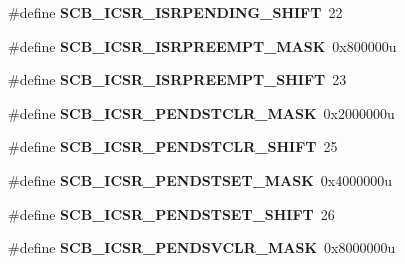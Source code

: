 \begin{DoxyCompactItemize}
\item 
\hypertarget{group___s_c_b___register___masks_ga22f457e32a8d6a617ff90bdfb7b874de}{}\#define {\bfseries S\+C\+B\+\_\+\+I\+C\+S\+R\+\_\+\+I\+S\+R\+P\+E\+N\+D\+I\+N\+G\+\_\+\+S\+H\+I\+F\+T}~22\label{group___s_c_b___register___masks_ga22f457e32a8d6a617ff90bdfb7b874de}

\item 
\hypertarget{group___s_c_b___register___masks_ga5ecbf8248ffbd07923fc188497a5a931}{}\#define {\bfseries S\+C\+B\+\_\+\+I\+C\+S\+R\+\_\+\+I\+S\+R\+P\+R\+E\+E\+M\+P\+T\+\_\+\+M\+A\+S\+K}~0x800000u\label{group___s_c_b___register___masks_ga5ecbf8248ffbd07923fc188497a5a931}

\item 
\hypertarget{group___s_c_b___register___masks_gafc9c373a4862603c06eaade5503d9fc7}{}\#define {\bfseries S\+C\+B\+\_\+\+I\+C\+S\+R\+\_\+\+I\+S\+R\+P\+R\+E\+E\+M\+P\+T\+\_\+\+S\+H\+I\+F\+T}~23\label{group___s_c_b___register___masks_gafc9c373a4862603c06eaade5503d9fc7}

\item 
\hypertarget{group___s_c_b___register___masks_ga7dc9d2d6061166d9cfa66904477acd2e}{}\#define {\bfseries S\+C\+B\+\_\+\+I\+C\+S\+R\+\_\+\+P\+E\+N\+D\+S\+T\+C\+L\+R\+\_\+\+M\+A\+S\+K}~0x2000000u\label{group___s_c_b___register___masks_ga7dc9d2d6061166d9cfa66904477acd2e}

\item 
\hypertarget{group___s_c_b___register___masks_ga4681662981a7a9ce4c39ba42e79bdf36}{}\#define {\bfseries S\+C\+B\+\_\+\+I\+C\+S\+R\+\_\+\+P\+E\+N\+D\+S\+T\+C\+L\+R\+\_\+\+S\+H\+I\+F\+T}~25\label{group___s_c_b___register___masks_ga4681662981a7a9ce4c39ba42e79bdf36}

\item 
\hypertarget{group___s_c_b___register___masks_gaec656bf7e4d2fdcacfe0ef3e16397a04}{}\#define {\bfseries S\+C\+B\+\_\+\+I\+C\+S\+R\+\_\+\+P\+E\+N\+D\+S\+T\+S\+E\+T\+\_\+\+M\+A\+S\+K}~0x4000000u\label{group___s_c_b___register___masks_gaec656bf7e4d2fdcacfe0ef3e16397a04}

\item 
\hypertarget{group___s_c_b___register___masks_ga048d1683c88c61f80f5c80173bf5e981}{}\#define {\bfseries S\+C\+B\+\_\+\+I\+C\+S\+R\+\_\+\+P\+E\+N\+D\+S\+T\+S\+E\+T\+\_\+\+S\+H\+I\+F\+T}~26\label{group___s_c_b___register___masks_ga048d1683c88c61f80f5c80173bf5e981}

\item 
\hypertarget{group___s_c_b___register___masks_ga12a45a6af09cbefd431d033d8411220e}{}\#define {\bfseries S\+C\+B\+\_\+\+I\+C\+S\+R\+\_\+\+P\+E\+N\+D\+S\+V\+C\+L\+R\+\_\+\+M\+A\+S\+K}~0x8000000u\label{group___s_c_b___register___masks_ga12a45a6af09cbefd431d033d8411220e}


\end{DoxyCompactItemize}
